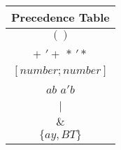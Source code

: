 \begin{tabular}{ |c| }
    \hline
    \textbf{Precedence Table} \\
    \hline
    $()$ \\
    \hline
    $+$ \quad $'+$ \quad $*$ \quad $'*$ \\
    \hline
    $[number;number]$ \\
    \hline
    $ab$ \quad $a'b$ \\
    \hline
    $|$ \\
    \hline
    $\&$ \\
    \hline
    $\{ay,BT\}$ \\
    \hline
\end{tabular}